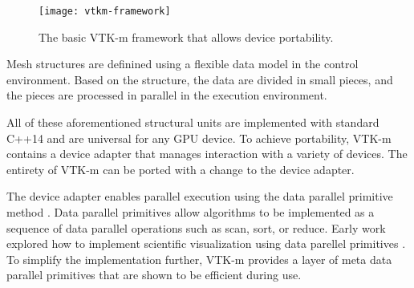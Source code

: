 \begin{figure}[htb]
  \texttt{[image: vtkm-framework]}
  \caption{The basic VTK-m framework that allows device portability.}
  \label{fig:vtkm-framework}
\end{figure}

Mesh structures are definined using a flexible data model \cite{Meredith2012} in the control environment.
Based on the structure, the data are divided in small pieces, and the pieces are processed in parallel in the execution environment.

All of these aforementioned structural units are implemented with standard C++14 and are universal for any GPU device.
To achieve portability, VTK-m contains a device adapter that manages interaction with a variety of devices.
The entirety of VTK-m can be ported with a change to the device adapter.

The device adapter enables parallel execution using the data parallel primitive method \cite{Blelloch1990}.
Data parallel primitives allow algorithms to be implemented as a sequence of data parallel operations such as scan, sort, or reduce.
Early work explored how to implement scientific visualization using data parellel primitives \cite{Lo2012}.
To simplify the implementation further, VTK-m provides a layer of meta data parallel primitives \cite{Moreland2021} that are shown to be efficient during use.
